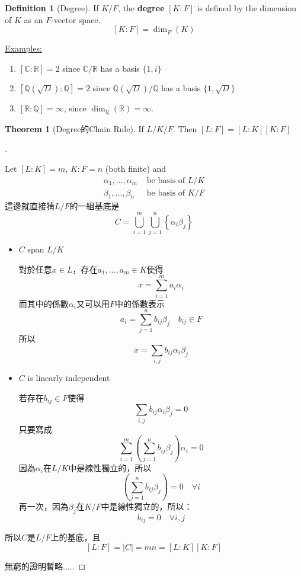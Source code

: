 \documentclass[12pt]{article}
\theoremstyle{definition}
\newtheorem{thm}{Theorem}
\newcommand{\ex}{\noindent\underline{Examples:}}
\newtheorem{dfn}{Definition}
\newenvironment{proofs}[1][\proofname]{%
  \begin{proof}[#1]$ $\par\nobreak\ignorespaces
}{%
  \end{proof}
}
\newcommand{\CC}{\mathbb C}
\newcommand{\QQ}{\mathbb Q}
\newcommand{\RR}{\mathbb R}
\begin{document}
\begin{dfn}[Degree]
	If $K/F$, the \textbf{degree} $[K:F]$ is defined by the dimension of $K$ as an $F$-vector space.
	\[ [K:F]=\dim_F(K) \]
\end{dfn}

\ex

\begin{enumerate}
	\item $[\CC: \RR]=2$ since $\CC /\RR $ has a basis $\{1,i\}$
	\item $[\QQ(\sqrt{D}):\QQ]=2$ since $\QQ(\sqrt{D})/\QQ$ has a basis $\{1,\sqrt{D}\}$
	\item $[\RR:\QQ]=\infty$, since $\dim_\QQ(\RR)=\infty$.
\end{enumerate}

\begin{thm}[Degree的Chain Rule]
	If $L/K/F$. Then $[L:F]=[L:K][K:F]$
\end{thm}

\begin{proofs}
	Let $[L:K]=m$, $K:F=n$ (both finite) and
	\begin{align*}
		\alpha_1,\dots,\alpha_m & \text{ be basis of } L/K \\
		\beta_1,\dots, \beta_n  & \text{ be basis of } K/F
	\end{align*}
	這邊就直接猜$L/F$的一組基底是
	\[
		C=\bigcup_{i=1}^m \bigcup_{j=1}^n \left\{\alpha_i\beta_j\right\}
	\]
	\begin{itemize}
		\item $C$ span $L/K$

		      對於任意$x\in L$，存在$a_1,\dots,a_m\in K$使得
		      \[x=\sum_{i=1}^m a_i \alpha_i\]
		      而其中的係數$\alpha_i$又可以用$F$中的係數表示
		      \[a_i=\sum_{j=1}^n b_{ij}\beta_j\quad b_{ij}\in F\]
		      所以
		      \[x=\sum_{i,j} b_{ij} \boxed{\alpha_i \beta_j}\]

		\item $C$ is linearly independent

		      若存在$b_{ij}\in F$使得
		      \[\sum_{i,j} b_{ij} {\alpha_i \beta_j}=0\]
		      只要寫成
		      \[\sum_{i = 1}^{m}\left(\sum_{j = 1}^{n}b_{ij}\beta_j\right) \alpha_i = 0\]
		      因為$\alpha_i$在$L/K$中是線性獨立的，所以
		      \[\left(\sum_{j = 1}^{n}b_{ij}\beta_j\right) = 0 \quad \forall i\]
		      再一次，因為$\beta_j$在$K/F$中是線性獨立的，所以：
		      \[b_{ij} = 0 \quad \forall i,j\]
	\end{itemize}
	所以$C$是$L/F$上的基底，且
	\[[L:F]=|C|=mn=[L:K][K:F]\]

	無窮的證明暫略.....
\end{proofs}
\end{document}
